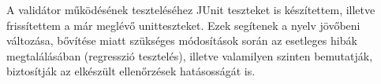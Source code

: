 A validátor működésének teszteléséhez JUnit teszteket is készítettem, illetve frissítettem a már meglévő unitteszteket. Ezek segítenek a nyelv jövőbeni változása, bővítése miatt szükséges módosítások során az esetleges hibák megtalálásában (regresszió tesztelés), illetve valamilyen szinten bemutatják, biztosítják az elkészült ellenőrzések hatásosságát is.
